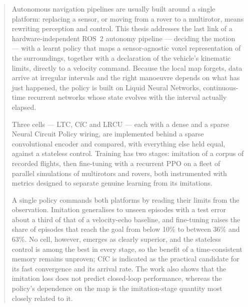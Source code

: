 
\begin{abstract}

Autonomous navigation pipelines are usually built around a single platform:
replacing a sensor, or moving from a rover to a multirotor, means rewriting
perception and control. This thesis addresses the last link of a
hardware-independent ROS~2 autonomy pipeline --- deciding the motion --- with a
learnt policy that maps a sensor-agnostic voxel representation of the
surroundings, together with a declaration of the vehicle's kinematic limits,
directly to a velocity command. Because the local map forgets, data arrive at
irregular intervals and the right manoeuvre depends on what has just happened,
the policy is built on Liquid Neural Networks, continuous-time recurrent networks
whose state evolves with the interval actually elapsed.

Three cells --- LTC, CfC and LRCU --- each with a dense and a sparse Neural
Circuit Policy wiring, are implemented behind a sparse convolutional encoder and
compared, with everything else held equal, against a stateless control. Training
has two stages: imitation of a corpus of recorded flights, then fine-tuning with
a recurrent PPO on a fleet of parallel simulations of multirotors and rovers,
both instrumented with metrics designed to separate genuine learning from its
imitations.

A single policy commands both platforms by reading their limits from the
observation. Imitation generalises to unseen episodes with a test error about a
third of that of a velocity-echo baseline, and fine-tuning raises the share of
episodes that reach the goal from below 10\% to between 36\% and 63\%. No cell,
however, emerges as clearly superior, and the stateless control is among the best
in every stage, so the benefit of a time-consistent memory remains unproven; CfC
is indicated as the practical candidate for its fast convergence and its arrival
rate. The work also shows that the imitation loss does not predict closed-loop
performance, whereas the policy's dependence on the map is the imitation-stage
quantity most closely related to it.

\end{abstract}
